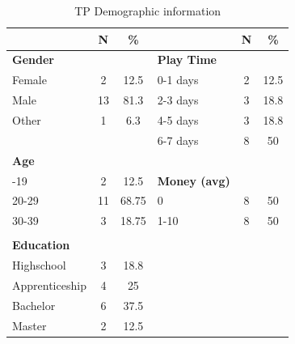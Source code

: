 \begin{table}
\begin{center}
 \begin{tabular}{p{2cm} c c p{2cm} c c}
  \hline
  &  N & \% & & N & \% \\ 
 \hline
 \textbf{Gender} &  &  & \textbf{Play Time} &  &  \\ 
 Female & 2 & 12.5 & 0-1 days & 2 & 12.5 \\
 Male & 13 & 81.3  & 2-3 days & 3 & 18.8 \\
 Other & 1 & 6.3   & 4-5 days & 3 & 18.8 \\
    &  &  & 6-7 days & 8 & 50  \\ 
    
  \textbf{Age} & & & & &\\
 -19 & 2 & 12.5 &  \textbf{Money (avg)}\\
  20-29 & 11 & 68.75 &  0 & 8 & 50\\
  30-39 & 3 & 18.75 &  1-10 & 8 & 50\\
                       \\
\textbf{Education} &  &  &  &  &  \\ 
 Highschool & 3 & 18.8 &  \\
 Apprenticeship & 4 & 25 &  \\
 Bachelor & 6 & 37.5 &  \\
 Master & 2 & 12.5 &  \\
  \hline
\end{tabular}
\end{center}
\caption{TP Demographic information}
\label{table:dem-pubg}
\end{table}

